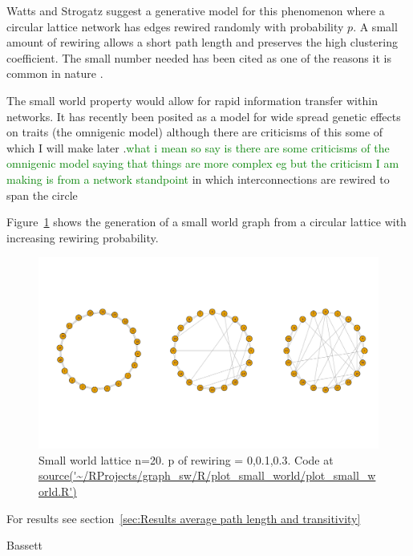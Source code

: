 Watts and Strogatz \cite{watts1998collective} suggest a generative model for this phenomenon where a circular lattice network has edges rewired randomly with probability $p$. A small amount of rewiring allows a short path length and preserves the high clustering coefficient. The small number needed has been cited as one of the reasons it is common in nature . 

The small world property would allow for rapid information transfer within networks. It has recently been posited as a model for wide spread genetic effects on traits (the omnigenic model) \cite{boyle2017expanded} although there are criticisms of this some of which I will make later .\textcolor{green}{what i mean so say is there are some criticisms of the omnigenic model saying that things are more complex eg \cite{wray2018common} \cite{boyle2017omnigenic_response}  but the criticism I am making is from a network standpoint} 
in which interconnections are rewired to span the circle

Figure~\ref{fig:small_world} shows the generation of a small world graph from a circular lattice with increasing rewiring probability.

\begin{figure}
    \centering
    \includegraphics[width=\textwidth]{images/Rplot_corrected_small_world.png}
    \caption{Small world lattice n=20. p of rewiring = 0,0.1,0.3. Code at \url{source('~/RProjects/graph_sw/R/plot_small_world/plot_small_world.R')}}
    \label{fig:small_world}
\end{figure}

For results see section~\ref{sec:Results average path length and transitivity}

Bassett \cite{bassett2017small}

